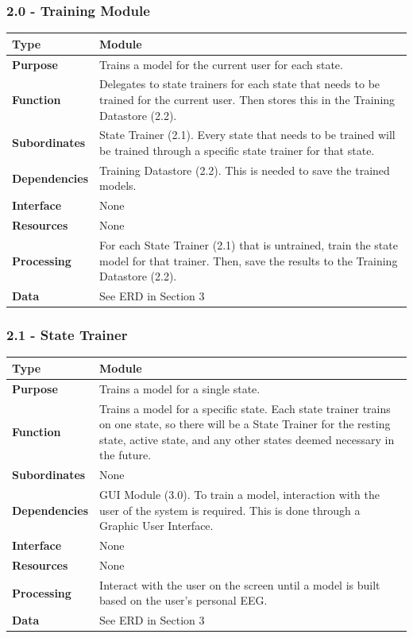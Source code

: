 \documentclass{article}
\begin{document}
\subsubsection*{2.0 - Training Module}
\begin{tabular}{ | l |  p{13.3cm} |}
\hline
\textbf{Type} & Module \\ \hline
\textbf{Purpose} & Trains a model for the current user for each state. \\ \hline
\textbf{Function} & Delegates to state trainers for each state that needs to be trained for the current user. Then stores this in the Training Datastore (2.2). \\ \hline
\textbf{Subordinates} & State Trainer (2.1). Every state that needs to be trained will be trained through a specific state trainer for that state. \\ \hline
\textbf{Dependencies} & Training Datastore (2.2). This is needed to save the trained models. \\ \hline
\textbf{Interface} & None \\ \hline
\textbf{Resources} & None \\ \hline
\textbf{Processing} & For each State Trainer (2.1) that is untrained, train the state model for that trainer. Then, save the results to the Training Datastore (2.2). \\ \hline
\textbf{Data} & See ERD in Section 3 \\ \hline
\end{tabular}

\subsubsection*{2.1 - State Trainer}
\begin{tabular}{ | l |  p{13.3cm} |}
\hline
\textbf{Type} & Module \\ \hline
\textbf{Purpose} & Trains a model for a single state. \\ \hline
\textbf{Function} & Trains a model for a specific state. Each state trainer trains on one state, so there will be a State Trainer for the resting state, active state, and any other states deemed necessary in the future. \\ \hline
\textbf{Subordinates} & None \\ \hline
\textbf{Dependencies} & GUI Module (3.0). To train a model, interaction with the user of the system is required. This is done through a Graphic User Interface.  \\ \hline
\textbf{Interface} & None \\ \hline
\textbf{Resources} & None \\ \hline
\textbf{Processing} & Interact with the user on the screen until a model is built based on the user's personal EEG. \\ \hline
\textbf{Data} & See ERD in Section 3 \\ \hline
\end{tabular}
\end{document}
